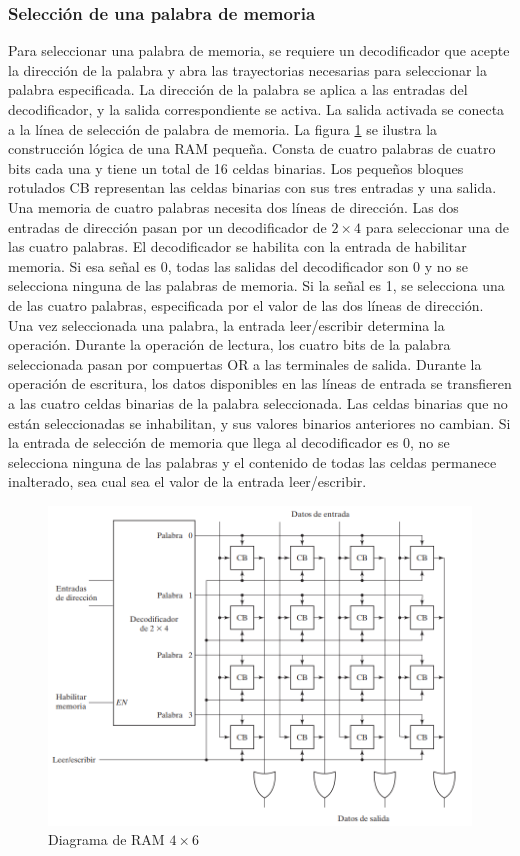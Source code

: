 \subsubsection{Selección de una palabra de memoria}
Para seleccionar una palabra de memoria, se requiere un decodificador que acepte la dirección de la palabra y abra las trayectorias necesarias para seleccionar la palabra especificada. La dirección de la palabra se aplica a las entradas del decodificador, y la salida correspondiente se activa. La salida activada se conecta a la línea de selección de palabra de memoria. La figura \ref{fig:memfoto3} se ilustra la construcción lógica de una RAM pequeña. Consta de cuatro palabras de cuatro bits cada una y tiene un total de 16 celdas binarias. Los pequeños bloques rotulados CB representan las celdas binarias con sus tres entradas y una salida. Una memoria de cuatro palabras necesita dos líneas de dirección. Las dos entradas de dirección pasan por un decodificador de $2 \times 4$ para seleccionar una de las cuatro palabras. El decodificador se habilita con la entrada de habilitar memoria. Si esa señal es 0, todas las salidas del decodificador son 0 y no se selecciona ninguna de las palabras de memoria. Si la señal es 1, se selecciona una de las cuatro palabras, especificada por el valor de las dos líneas de dirección. Una vez seleccionada una palabra, la entrada leer/escribir determina la operación. Durante la operación de lectura, los cuatro bits de la palabra seleccionada pasan por compuertas OR a las terminales de salida. Durante la operación de escritura, los datos disponibles en las líneas de entrada se transfieren a las cuatro celdas binarias de la palabra
seleccionada. Las celdas binarias que no están seleccionadas se inhabilitan, y sus valores binarios anteriores no cambian. Si la entrada de selección de memoria que llega al decodificador es 0, no se selecciona ninguna de las palabras y el contenido de todas las celdas permanece inalterado, sea cual sea el valor de la entrada leer/escribir.

\newpage
\begin{figure}[h]
\centering
\includegraphics[scale=0.7]{img/selectdeco.png}
\caption{Diagrama de RAM $4 \times 6$}
\label{fig:memfoto3}
\end{figure}

